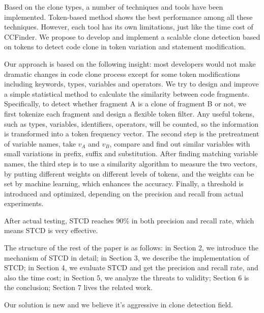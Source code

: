 \documentclass[../main.tex]{subfiles}
\begin{document}


Based on the clone types, a number of techniques and tools have been implemented. Token-based method shows the best performance among all these techniques. However, each tool has its own limitations, just like the time cost of CCFinder. We propose to develop and implement a scalable clone detection based on tokens to detect code clone in token variation and statement modification.

Our approach is based on the following insight: most developers would not make dramatic changes in code clone process except for some token modifications including keywords, types, variables and operators. 
We try to design and improve a simple statistical method to calculate the similarity between code fragments. 
Specifically, to detect whether fragment A is a clone of fragment B or not, we first tokenize each fragment and design a flexible token filter. Any useful tokens, such as types, variables, identifiers, operators, will be counted, so the information is transformed into a token frequency vector. 
The second step is the pretreatment of variable names, take $v_A$ and $v_B$, compare and find out similar variables with small variations in prefix, suffix and substitution. 
After finding matching variable names, the third step is to use a similarity algorithm to measure the two vectors, by putting different weights on different levels of tokens, and the weights can be set by machine learning, which enhances the accuracy.
Finally, a threshold is introduced and optimized, depending on the precision and recall from actual experiments.

After actual testing, STCD reaches 90\% in both precision and recall rate, which means STCD is very effective.

The structure of the rest of the paper is as follows: in Section 2, we introduce the mechanism of STCD in detail; in Section 3, we describe the implementation of STCD; in Section 4, we evaluate STCD and get the precision and recall rate, and also the time cost; in Section 5, we analyze the threats to validity; Section 6 is the conclusion; Section 7 lives the related work. 

%

Our solution is new and we believe it's aggressive in clone detection field.
\end{document}
